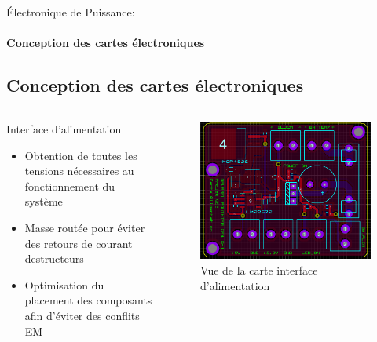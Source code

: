 \documentclass{beamer}
\begin{document}
	\begin{frame}{Électronique de Puissance:}
		\framesubtitle{Conception des cartes électroniques}
		\subsection[PCBs]{Conception des cartes électroniques}
		\begin{columns}[T]
	  		\begin{column}{0.5\textwidth}
	  			Interface d'alimentation
		    	\begin{itemize}
		    		\item Obtention de toutes les tensions nécessaires au fonctionnement du système
		    		\item Masse routée pour éviter des retours de courant destructeurs
		    		\item Optimisation du placement des composants afin d'éviter des conflits EM
		    	\end{itemize}
	  		\end{column}
	  		\begin{column}{0.5\textwidth}
	  			\begin{figure}
	  				\begin{center}
	  					\includegraphics[height=0.5\textheight]{../Illus/PCB_Alim.PNG}
	  				\end{center}
	    			\caption{Vue de la carte interface d'alimentation}
	    		\end{figure}
	  		\end{column}
		\end{columns}
	\end{frame}
\end{document}
